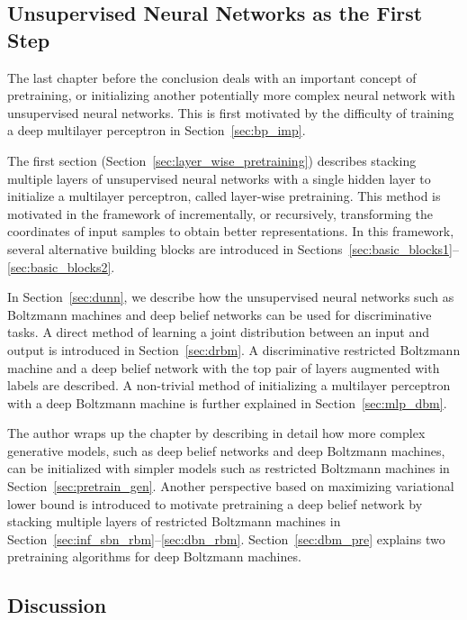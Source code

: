 \documentclass{now}
\newcommand{\alert}[1]{\textcolor{red}{#1}}
\newcommand{\citepub}[1]{\alert{#1}}
\begin{document}
\subsection{Unsupervised Neural Networks as the First Step}

The last chapter before the conclusion deals with an important concept of
pretraining, or initializing another potentially more complex neural network
with unsupervised neural networks. This is first motivated by the difficulty of
training a deep multilayer perceptron in Section~\ref{sec:bp_imp}.

The first section (Section~\ref{sec:layer_wise_pretraining}) describes stacking
multiple layers of unsupervised neural networks with a single hidden layer to
initialize a multilayer perceptron, called layer-wise pretraining. This method
is motivated in the framework of incrementally, or recursively, transforming
the coordinates of input samples to obtain better representations. In this
framework, several alternative building blocks are introduced in
Sections~\ref{sec:basic_blocks1}--\ref{sec:basic_blocks2}.

In Section~\ref{sec:dunn}, we describe how the unsupervised neural networks
such as Boltzmann machines and deep belief networks can be used for
discriminative tasks. A direct method of learning a joint distribution between
an input and output is introduced in Section~\ref{sec:drbm}. A discriminative
restricted Boltzmann machine and a deep belief network with the top pair of
layers augmented with labels are described. A non-trivial method of
initializing a multilayer perceptron with a deep Boltzmann machine is further
explained in Section~\ref{sec:mlp_dbm}.

The author wraps up the chapter by describing in detail how more complex
generative models, such as deep belief networks and deep Boltzmann machines,
can be initialized with simpler models such as restricted Boltzmann machines in
Section~\ref{sec:pretrain_gen}. Another perspective based on maximizing
variational lower bound is introduced to motivate pretraining a deep belief
network by stacking multiple layers of restricted Boltzmann machines in
Section~\ref{sec:inf_sbn_rbm}--\ref{sec:dbn_rbm}.  Section~\ref{sec:dbm_pre}
explains two pretraining algorithms for deep Boltzmann machines. 

\subsection{Discussion}
\end{document}
